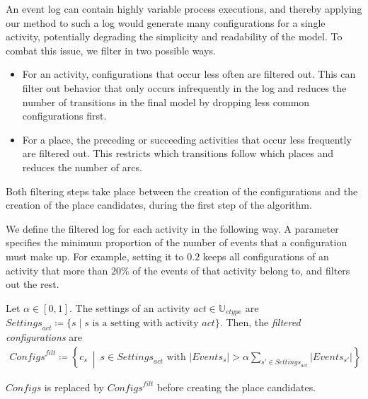 An event log can contain highly variable process executions, and thereby applying our method to such a log would generate many configurations for a single activity, potentially degrading the simplicity and readability of the model.
To combat this issue, we filter in two possible ways.
\begin{itemize}
    \item
    For an activity, configurations that occur less often are filtered out.
    This can filter out behavior that only occurs infrequently in the log and reduces the number of transitions in the final model by dropping less common configurations first.
    
    \item
    For a place, the preceding or succeeding activities that occur less frequently are filtered out.
    This restricts which transitions follow which places and reduces the number of arcs.
\end{itemize}
Both filtering steps take place between the creation of the configurations and the creation of the place candidates, during the first step of the algorithm.



We define the filtered log for each activity in the following way.
A parameter specifies the minimum proportion of the number of events that a configuration must make up.
For example, setting it to $0.2$ keeps all configurations of an activity that more than $20\%$ of the events of that activity belong to, and filters out the rest.
\begin{definition}
    Let $\alpha \in [0, 1]$.
    The settings of an activity $act \in \mathbb{U}_{etype}$ are $\mathit{Settings}_{act} \coloneqq \{ s \mid s \text{ is a setting with activity } act \}$.
    Then, the \emph{filtered configurations} are
    \begin{align*}
        \mathit{Configs}^{filt} \coloneqq \left\{ c_s \ \middle| \ s \in \mathit{Settings}_{act} \text{ with } \left|\mathit{Events}_s\right| > \alpha \sum_{s' \in \mathit{Settings}_{act}} \left|\mathit{Events}_{s'}\right| \right\}
    \end{align*}
\end{definition}
$\mathit{Configs}$ is replaced by $\mathit{Configs}^{filt}$ before creating the place candidates.



